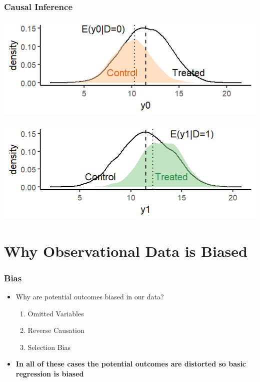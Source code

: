 \documentclass[xcolor=x11names,compress]{beamer}\usepackage[]{graphicx}\usepackage[]{color}
\makeatletter
\def\maxwidth{ %
  \ifdim\Gin@nat@width>\linewidth
    \linewidth
  \else
    \Gin@nat@width
  \fi
}
\newenvironment{knitrout}{}{} %
\renewcommand{\(}{\begin{columns}}
\renewcommand{\)}{\end{columns}}
\newcommand{\<}[1]{\begin{column}{#1}}
\renewcommand{\>}{\end{column}}
\makeatother
\begin{document}
\begin{frame}
\frametitle{Causal Inference}
\begin{knitrout}
\color{fgcolor}
\includegraphics[width=\maxwidth]{figure/OVB1d-1} 

\end{knitrout}

\begin{knitrout}
\color{fgcolor}
\includegraphics[width=\maxwidth]{figure/OVB2d-1} 

\end{knitrout}
\end{frame}

\section{Why Observational Data is Biased}

\begin{frame}
\frametitle{Bias}
\begin{itemize}
\item Why are potential outcomes biased in our data?
\begin{enumerate}
\item Omitted Variables
\item Reverse Causation
\item Selection Bias
\end{enumerate}
\item \textbf{In all of these cases the potential outcomes are distorted so basic regression is biased}
\end{itemize}
\end{frame}
\end{document}
